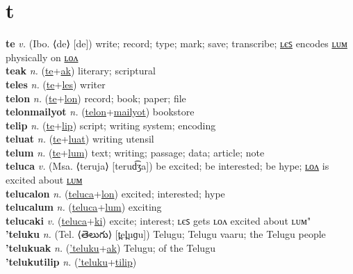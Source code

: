\section{t}

\textbf{te} \textit{v.} (Ibo. ⟨de⟩ [de])
write; record; type; mark; save; transcribe; \hyperref[teles]{ʟєꜱ} encodes \hyperref[telum]{ʟᴜᴍ} physically on \hyperref[telon]{ʟᴏᴧ} \label{te} \\
\textbf{teak} \textit{n.} (\hyperref[te]{te}+\hyperref[ak]{ak})
literary; scriptural \label{teak} \\
\textbf{teles} \textit{n.} (\hyperref[te]{te}+\hyperref[les]{les})
writer \label{teles} \\
\textbf{telon} \textit{n.} (\hyperref[te]{te}+\hyperref[lon]{lon})
record; book; paper; file \label{telon} \\
\textbf{telonmailyot} \textit{n.} (\hyperref[telon]{telon}+\hyperref[mailyot]{mailyot})
bookstore \label{telonmailyot} \\
\textbf{telip} \textit{n.} (\hyperref[te]{te}+\hyperref[lip]{lip})
script; writing system; encoding \label{telip} \\
\textbf{teluat} \textit{n.} (\hyperref[te]{te}+\hyperref[luat]{luat})
writing utensil \label{teluat} \\
\textbf{telum} \textit{n.} (\hyperref[te]{te}+\hyperref[lum]{lum})
text; writing; passage; data; article; note \label{telum} \\
\textbf{teluca} \textit{v.} (Msa. ⟨teruja⟩ [terud͡ʒa])
be excited; be interested; be hype; \hyperref[telucalon]{ʟᴏᴧ} is excited about \hyperref[telucalum]{ʟᴜᴍ} \label{teluca} \\
\textbf{telucalon} \textit{n.} (\hyperref[teluca]{teluca}+\hyperref[lon]{lon})
excited; interested; hype \label{telucalon} \\
\textbf{telucalum} \textit{n.} (\hyperref[teluca]{teluca}+\hyperref[lum]{lum})
exciting \label{telucalum} \\
\textbf{telucaki} \textit{v.} (\hyperref[teluca]{teluca}+\hyperref[ki]{ki})
excite; interest; ʟєꜱ gets ʟᴏᴧ excited about ʟᴜᴍ" \label{telucaki} \\
\textbf{'teluku} \textit{n.} (Tel. ⟨తెలుగు⟩ [t̪el̪uɡu])
Telugu; Telugu vaaru; the Telugu people \label{'teluku} \\
\textbf{'telukuak} \textit{n.} (\hyperref['teluku]{'teluku}+\hyperref[ak]{ak})
Telugu; of the Telugu \label{'telukuak} \\
\textbf{'telukutilip} \textit{n.} (\hyperref['teluku]{'teluku}+\hyperref[tilip]{tilip})
